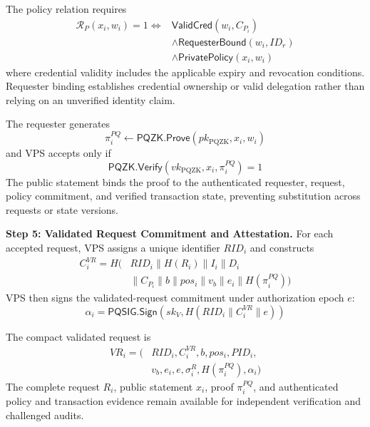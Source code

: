 \documentclass[lettersize,journal]{IEEEtran}
\begin{document}
    The policy relation requires
    \begin{equation}
    \begin{aligned}
    \mathcal{R}_{P}(x_i,w_i)=1
    \iff{}&
    \mathsf{ValidCred}(w_i,C_{P_i})\\
    &\land\mathsf{RequesterBound}(w_i,ID_r)\\
    &\land\mathsf{PrivatePolicy}(x_i,w_i)
    \end{aligned}
    \end{equation}
    where credential validity includes the
    applicable expiry and revocation conditions.
    Requester binding establishes credential
    ownership or valid delegation rather than
    relying on an unverified identity claim.
    
    The requester generates
    \begin{equation}
    \pi_i^{PQ}\leftarrow
    \mathsf{PQZK.Prove}
    (pk_{\mathrm{PQZK}},x_i,w_i)
    \end{equation}
    and VPS accepts only if
    \begin{equation}
    \mathsf{PQZK.Verify}
    (vk_{\mathrm{PQZK}},x_i,\pi_i^{PQ})=1
    \end{equation}
    The public statement binds the proof to
    the authenticated requester, request,
    policy commitment, and verified transaction
    state, preventing substitution across
    requests or state versions.
    
    \medskip
    \noindent\textbf{Step 5: Validated Request
    Commitment and Attestation.}
    For each accepted request, VPS assigns a
    unique identifier $RID_i$ and constructs
    \begin{equation}
    \begin{aligned}
    C_i^{VR}=H\big(&RID_i\parallel H(R_i)
    \parallel I_i\parallel D_i\\
    &\parallel C_{P_i}\parallel b {\parallel pos_i}
    \parallel v_b\parallel e_i
    \parallel H(\pi_i^{PQ})\big)
    \end{aligned}
    \end{equation}
    VPS then signs the validated-request
    commitment under authorization epoch $e$:
    \begin{equation}
    \alpha_i=
    \mathsf{PQSIG.Sign}
    \left(
    sk_V,H(RID_i\parallel C_i^{VR}\parallel e)
    \right)
    \end{equation}
    
    The compact validated request is
    \begin{equation}
    \begin{aligned}
    VR_i=\big(&RID_i,C_i^{VR},b,pos_i,PID_i,\\
    &v_b,e_i,e,\sigma_i^R,
    H(\pi_i^{PQ}),\alpha_i\big)
    \end{aligned}
    \end{equation}
    The complete request $R_i$, public
    statement $x_i$, proof $\pi_i^{PQ}$,
    and authenticated policy and transaction
    evidence remain available for independent
    verification and challenged audits.
    
\end{document}
